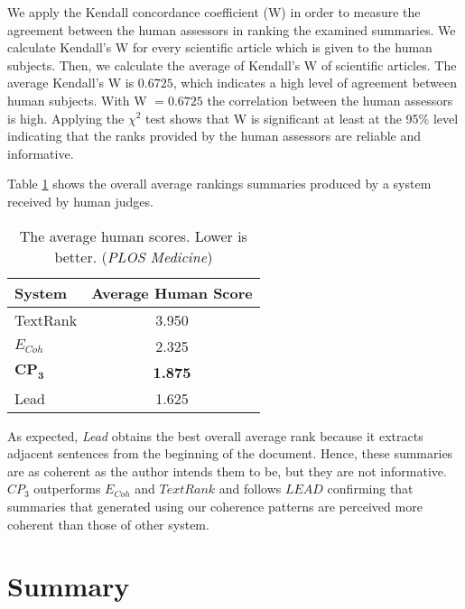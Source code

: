 We apply the Kendall concordance coefficient (W) \cite{siegel88} in order to measure the agreement between the human assessors in ranking the examined summaries. 
We calculate Kendall's W for every scientific article which is given to the human subjects. 
Then, we calculate the average of Kendall's W of scientific articles. 
The average Kendall's W is $0.6725$,  which indicates a high level of agreement between human subjects.
With W $= 0.6725$ the correlation between the human assessors is high. 
Applying the $\chi^2$ test shows that W is significant at least at the 95\% level indicating that the ranks provided by the human assessors are reliable and informative.

Table \ref{table:coherence_assessment} shows the overall average rankings summaries produced by a system received by human judges. 

\begin{table}[!ht]
\centering
\small
\begin{tabular}{l|c}
\hline
System &  Average Human Score\\
\hline
TextRank & 3.950\\
$E_{Coh}$ & 2.325\\
$\mathbf{CP_3}$ & \textbf{1.875} \\
Lead & 1.625\\
\hline
\end{tabular}
\caption{The average human scores. Lower is better. (\emph{PLOS Medicine}) }
\label{table:coherence_assessment}
\end{table}

As expected, \emph{Lead} obtains the best overall average rank because it extracts adjacent sentences from the beginning of the document. 
Hence, these summaries are as coherent as the author intends them to be, but they are not informative.
\emph{$CP_3$} outperforms $E_{Coh}$ and $TextRank$ and follows $LEAD$ confirming that summaries that generated using our coherence patterns are perceived more coherent than those of other system. 



\section{Summary}
\label{sec:summary}

